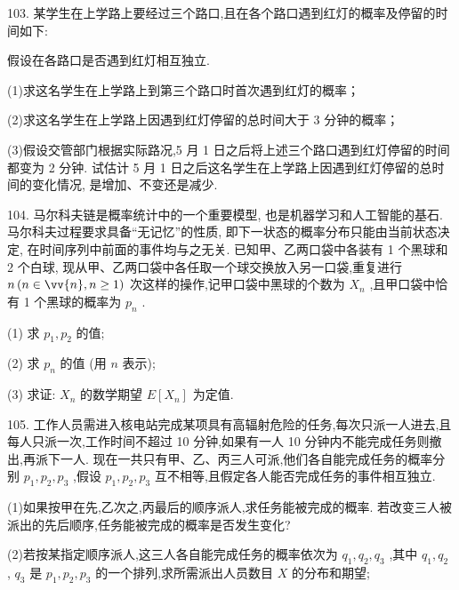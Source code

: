 103. 某学生在上学路上要经过三个路口,且在各个路口遇到红灯的概率及停留的时间如下:

\begin{center}
\end{center}

假设在各路口是否遇到红灯相互独立.

(1)求这名学生在上学路上到第三个路口时首次遇到红灯的概率；

(2)求这名学生在上学路上因遇到红灯停留的总时间大于 3 分钟的概率；

(3)假设交管部门根据实际路况,5 月 1 日之后将上述三个路口遇到红灯停留的时间都变为 2 分钟. 试估计 5 月 1 日之后这名学生在上学路上因遇到红灯停留的总时间的变化情况, 是增加、不变还是减少.

104. 马尔科夫链是概率统计中的一个重要模型, 也是机器学习和人工智能的基石. 马尔科夫过程要求具备“无记忆”的性质, 即下一状态的概率分布只能由当前状态决定, 在时间序列中前面的事件均与之无关. 已知甲、乙两口袋中各装有 1 个黑球和 2 个白球, 现从甲、乙两口袋中各任取一个球交换放入另一口袋,重复进行 $n\left( {n \in  \vv{n},n \geq  1}\right)$ 次这样的操作,记甲口袋中黑球的个数为 ${X}_{n}$ ,且甲口袋中恰有 1 个黑球的概率为 ${p}_{n}$ .

(1) 求 ${p}_{1},{p}_{2}$ 的值;

(2) 求 ${p}_{n}$ 的值 (用 $n$ 表示);

(3) 求证: ${X}_{n}$ 的数学期望 $E\left\lbrack  {X}_{n}\right\rbrack$ 为定值.

105. 工作人员需进入核电站完成某项具有高辐射危险的任务,每次只派一人进去,且每人只派一次,工作时间不超过 10 分钟,如果有一人 10 分钟内不能完成任务则撤出,再派下一人. 现在一共只有甲、乙、丙三人可派,他们各自能完成任务的概率分别 ${p}_{1},{p}_{2},{p}_{3}$ ,假设 ${p}_{1},{p}_{2},{p}_{3}$ 互不相等,且假定各人能否完成任务的事件相互独立.

(1)如果按甲在先,乙次之,丙最后的顺序派人,求任务能被完成的概率. 若改变三人被派出的先后顺序,任务能被完成的概率是否发生变化?

(2)若按某指定顺序派人,这三人各自能完成任务的概率依次为 ${q}_{1},{q}_{2},{q}_{3}$ ,其中 ${q}_{1},{q}_{2}$ , ${q}_{3}$ 是 ${p}_{1},{p}_{2},{p}_{3}$ 的一个排列,求所需派出人员数目 $X$ 的分布和期望;

